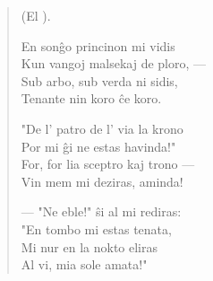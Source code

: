\begin{verse}
\begin{center}
\footnotesize (El ).
\end{center}

                     En son\^go princinon mi vidis\\
                     Kun vangoj malsekaj de ploro, ---\\
                     Sub arbo, sub verda ni sidis,\\
                     Tenante nin koro \^ce koro.

                     "De l' patro de l' via la krono\\
                     Por mi \^gi ne estas havinda!"\\
                     For, for lia sceptro kaj trono ---\\
                     Vin mem mi deziras, aminda!

                     — "Ne eble!" \^si al mi rediras:\\
                     "En tombo mi estas tenata,\\
                     Mi nur en la nokto eliras\\
                     Al vi, mia sole amata!"

\end{verse}


\smallrule{}